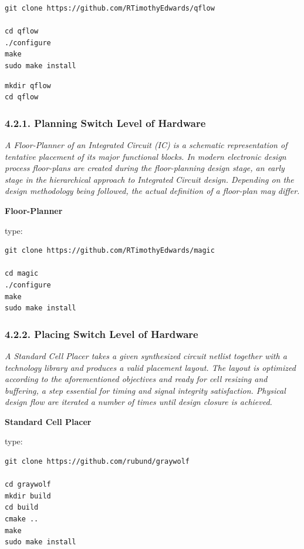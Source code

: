 \documentclass[]{article}
\begin{document}
\begin{verbatim}
git clone https://github.com/RTimothyEdwards/qflow

cd qflow
./configure
make
sudo make install
\end{verbatim}

\begin{verbatim}
mkdir qflow
cd qflow
\end{verbatim}

\subsubsection{4.2.1. Planning Switch Level of
Hardware}\label{planning-switch-level-of-hardware}

\emph{A Floor-Planner of an Integrated Circuit (IC) is a schematic
representation of tentative placement of its major functional blocks. In
modern electronic design process floor-plans are created during the
floor-planning design stage, an early stage in the hierarchical approach
to Integrated Circuit design. Depending on the design methodology being
followed, the actual definition of a floor-plan may differ.}

\textbf{Floor-Planner}

type:

\begin{verbatim}
git clone https://github.com/RTimothyEdwards/magic

cd magic
./configure
make
sudo make install
\end{verbatim}

\subsubsection{4.2.2. Placing Switch Level of
Hardware}\label{placing-switch-level-of-hardware}

\emph{A Standard Cell Placer takes a given synthesized circuit netlist
together with a technology library and produces a valid placement
layout. The layout is optimized according to the aforementioned
objectives and ready for cell resizing and buffering, a step essential
for timing and signal integrity satisfaction. Physical design flow are
iterated a number of times until design closure is achieved.}

\textbf{Standard Cell Placer}

type:

\begin{verbatim}
git clone https://github.com/rubund/graywolf

cd graywolf
mkdir build
cd build
cmake ..
make
sudo make install
\end{verbatim}
\end{document}
